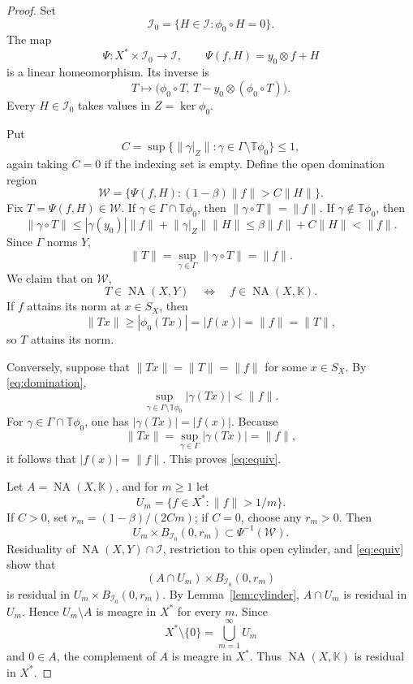 \documentclass[11pt]{article}
\newcommand{\K}{\mathbb K}
\newcommand{\T}{\mathbb T}
\newcommand{\NA}{\operatorname{NA}}
\newcommand{\norm}[1]{\lVert #1\rVert}
\begin{document}
\begin{proof}
Set
\[
 \mathcal I_0=\{H\in\mathcal I:\phi_0\circ H=0\}.
\]
The map
\[
 \Psi:X^*\times\mathcal I_0\longrightarrow\mathcal I,\qquad
 \Psi(f,H)=y_0\otimes f+H
 \tag{3}\label{eq:Psi}
\]
is a linear homeomorphism.  Its inverse is
\[
 T\longmapsto
 \bigl(\phi_0\circ T,\,T-y_0\otimes(\phi_0\circ T)\bigr).
\]
Every \(H\in\mathcal I_0\) takes values in \(Z=\ker\phi_0\).

Put
\[
 C=\sup\{\norm{\gamma|_Z}:
       \gamma\in\Gamma\setminus\T\phi_0\}\le 1,
\]
again taking \(C=0\) if the indexing set is empty.  Define the open domination
region
\[
 \mathcal W=\{\Psi(f,H):(1-\beta)\norm f>C\norm H\}.
 \tag{4}\label{eq:W}
\]
Fix \(T=\Psi(f,H)\in\mathcal W\).  If \(\gamma\in\Gamma\cap\T\phi_0\), then
\(\norm{\gamma\circ T}=\norm f\).  If \(\gamma\notin\T\phi_0\), then
\[
 \norm{\gamma\circ T}
 \le |\gamma(y_0)|\norm f+\norm{\gamma|_Z}\norm H
 \le \beta\norm f+C\norm H
 <\norm f.
 \tag{5}\label{eq:domination}
\]
Since \(\Gamma\) norms \(Y\),
\[
 \norm T
 =\sup_{\gamma\in\Gamma}\norm{\gamma\circ T}
 =\norm f.
 \tag{6}\label{eq:normequal}
\]
We claim that on \(\mathcal W\),
\[
 T\in\NA(X,Y)\quad\Longleftrightarrow\quad f\in\NA(X,\K).
 \tag{7}\label{eq:equiv}
\]
If \(f\) attains its norm at \(x\in S_X\), then
\[
 \norm{Tx}\ge |\phi_0(Tx)|=|f(x)|=\norm f=\norm T,
\]
so \(T\) attains its norm.

Conversely, suppose that \(\norm{Tx}=\norm T=\norm f\) for some \(x\in S_X\).
By \eqref{eq:domination},
\[
 \sup_{\gamma\in\Gamma\setminus\T\phi_0}|\gamma(Tx)|
 <\norm f.
\]
For \(\gamma\in\Gamma\cap\T\phi_0\), one has
\(|\gamma(Tx)|=|f(x)|\).  Because
\[
 \norm{Tx}=\sup_{\gamma\in\Gamma}|\gamma(Tx)|=\norm f,
\]
it follows that \(|f(x)|=\norm f\).  This proves \eqref{eq:equiv}.

Let \(A=\NA(X,\K)\), and for \(m\ge1\) let
\[
 U_m=\{f\in X^*:\norm f>1/m\}.
\]
If \(C>0\), set \(r_m=(1-\beta)/(2Cm)\); if \(C=0\), choose any \(r_m>0\).
Then
\[
 U_m\times B_{\mathcal I_0}(0,r_m)\subset \Psi^{-1}(\mathcal W).
\]
Residuality of \(\NA(X,Y)\cap\mathcal I\), restriction to this open cylinder,
and \eqref{eq:equiv} show that
\[
 (A\cap U_m)\times B_{\mathcal I_0}(0,r_m)
\]
is residual in \(U_m\times B_{\mathcal I_0}(0,r_m)\).  By
Lemma~\ref{lem:cylinder}, \(A\cap U_m\) is residual in \(U_m\).  Hence
\(U_m\setminus A\) is meagre in \(X^*\) for every \(m\).  Since
\[
 X^*\setminus\{0\}=\bigcup_{m=1}^{\infty}U_m
\]
and \(0\in A\), the complement of \(A\) is meagre in \(X^*\).  Thus
\(\NA(X,\K)\) is residual in \(X^*\).
\end{proof}
\end{document}
